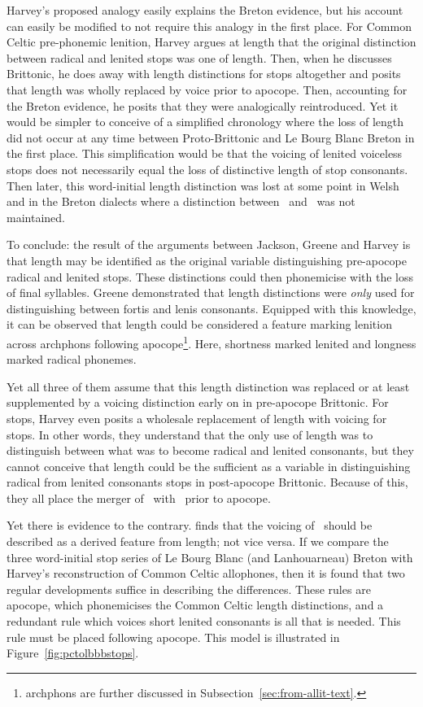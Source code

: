 Harvey's proposed analogy easily explains the Breton evidence, but his account can easily be modified to not require this analogy in the first place. For Common Celtic pre-phonemic lenition, Harvey argues at length that the original distinction between radical and lenited stops was one of length. Then, when he discusses Brittonic, he does away with length distinctions for stops altogether and posits that length was wholly replaced by voice prior to apocope. Then, accounting for the Breton evidence, he posits that they were analogically reintroduced. Yet it would be simpler to conceive of a simplified chronology where the loss of length did not occur at any time between Proto-Brittonic and Le Bourg Blanc Breton in the first place. This simplification would be that the voicing of lenited voiceless stops does not necessarily equal the loss of distinctive length of stop consonants. Then later, this word-initial length distinction was lost at some point in Welsh and in the Breton dialects where a distinction between \lT\ and \xD\ was not maintained.

To conclude: the result of the arguments between Jackson, Greene and Harvey is that length may be identified as the original variable distinguishing pre-apocope radical and lenited stops. These distinctions could then phonemicise with the loss of final syllables. Greene demonstrated that length distinctions were \emph{only} used for distinguishing between fortis and lenis consonants. Equipped with this knowledge, it can be observed that length could be considered a feature marking lenition across \gls{archphon}s following apocope\footnote{\Gls{archphon}s are further discussed in Subsection~\ref{sec:from-allit-text}.}. Here, shortness marked lenited and longness marked radical phonemes.

Yet all three of them assume that this length distinction was replaced or at least supplemented by a voicing distinction early on in pre-apocope Brittonic. For stops, Harvey even posits a wholesale replacement of length with voicing for stops. In other words, they understand that the only use of length was to distinguish between what was to become radical and lenited consonants, but they cannot conceive that length could be the sufficient as a variable in distinguishing radical from lenited consonants stops in post-apocope Brittonic. Because of this, they all place the merger of \lT\ with \xD\ prior to apocope.

Yet there is evidence to the contrary. \Textcite{carlyle_syllabic_1988} finds that the voicing of \lT\ should be described as a derived feature from length; not vice versa. If we compare the three word-initial stop series of Le Bourg Blanc (and Lanhouarneau) Breton with Harvey's reconstruction of Common Celtic allophones, then it is found that two regular developments suffice in describing the differences. These rules are apocope, which phonemicises the Common Celtic length distinctions, and a redundant rule which voices short \ie lenited consonants is all that is needed. This rule must be placed following apocope. This model is illustrated in Figure~\ref{fig:pctolbbbstops}.

